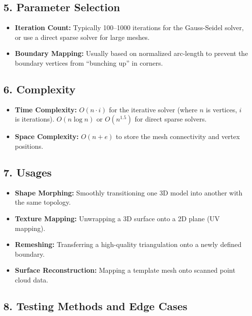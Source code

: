 \subsection{5. Parameter Selection}

\begin{itemize}
    \item \textbf{Iteration Count:} Typically 100--1000 iterations for the Gauss-Seidel solver, or use a direct sparse solver for large meshes.
    \item \textbf{Boundary Mapping:} Usually based on normalized arc-length to prevent the boundary vertices from ``bunching up'' in corners.
\end{itemize}

\subsection{6. Complexity}

\begin{itemize}
    \item \textbf{Time Complexity:} $O(n \cdot i)$ for the iterative solver (where $n$ is vertices, $i$ is iterations). $O(n \log n)$ or $O(n^{1.5})$ for direct sparse solvers.
    \item \textbf{Space Complexity:} $O(n + e)$ to store the mesh connectivity and vertex positions.
\end{itemize}

\subsection{7. Usages}

\begin{itemize}
    \item \textbf{Shape Morphing:} Smoothly transitioning one 3D model into another with the same topology.
    \item \textbf{Texture Mapping:} Unwrapping a 3D surface onto a 2D plane (UV mapping).
    \item \textbf{Remeshing:} Transferring a high-quality triangulation onto a newly defined boundary.
    \item \textbf{Surface Reconstruction:} Mapping a template mesh onto scanned point cloud data.
\end{itemize}

\subsection{8. Testing Methods and Edge Cases}

